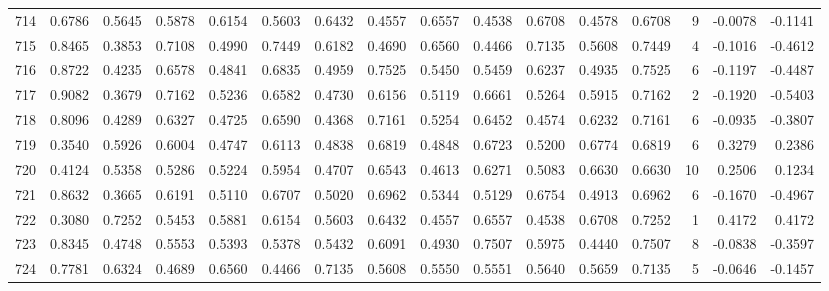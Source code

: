 \begin{tabular}{lrrrrrrrrrrrrrrr}
714 &      0.6786 &  0.5645 &  0.5878 &  0.6154 &  0.5603 &  0.6432 &  0.4557 &  0.6557 &  0.4538 &  0.6708 &   0.4578 &     0.6708 &      9 &                   -0.0078 &                    -0.1141 \\
715 &      0.8465 &  0.3853 &  0.7108 &  0.4990 &  0.7449 &  0.6182 &  0.4690 &  0.6560 &  0.4466 &  0.7135 &   0.5608 &     0.7449 &      4 &                   -0.1016 &                    -0.4612 \\
716 &      0.8722 &  0.4235 &  0.6578 &  0.4841 &  0.6835 &  0.4959 &  0.7525 &  0.5450 &  0.5459 &  0.6237 &   0.4935 &     0.7525 &      6 &                   -0.1197 &                    -0.4487 \\
717 &      0.9082 &  0.3679 &  0.7162 &  0.5236 &  0.6582 &  0.4730 &  0.6156 &  0.5119 &  0.6661 &  0.5264 &   0.5915 &     0.7162 &      2 &                   -0.1920 &                    -0.5403 \\
718 &      0.8096 &  0.4289 &  0.6327 &  0.4725 &  0.6590 &  0.4368 &  0.7161 &  0.5254 &  0.6452 &  0.4574 &   0.6232 &     0.7161 &      6 &                   -0.0935 &                    -0.3807 \\
719 &      0.3540 &  0.5926 &  0.6004 &  0.4747 &  0.6113 &  0.4838 &  0.6819 &  0.4848 &  0.6723 &  0.5200 &   0.6774 &     0.6819 &      6 &                    0.3279 &                     0.2386 \\
720 &      0.4124 &  0.5358 &  0.5286 &  0.5224 &  0.5954 &  0.4707 &  0.6543 &  0.4613 &  0.6271 &  0.5083 &   0.6630 &     0.6630 &     10 &                    0.2506 &                     0.1234 \\
721 &      0.8632 &  0.3665 &  0.6191 &  0.5110 &  0.6707 &  0.5020 &  0.6962 &  0.5344 &  0.5129 &  0.6754 &   0.4913 &     0.6962 &      6 &                   -0.1670 &                    -0.4967 \\
722 &      0.3080 &  0.7252 &  0.5453 &  0.5881 &  0.6154 &  0.5603 &  0.6432 &  0.4557 &  0.6557 &  0.4538 &   0.6708 &     0.7252 &      1 &                    0.4172 &                     0.4172 \\
723 &      0.8345 &  0.4748 &  0.5553 &  0.5393 &  0.5378 &  0.5432 &  0.6091 &  0.4930 &  0.7507 &  0.5975 &   0.4440 &     0.7507 &      8 &                   -0.0838 &                    -0.3597 \\
724 &      0.7781 &  0.6324 &  0.4689 &  0.6560 &  0.4466 &  0.7135 &  0.5608 &  0.5550 &  0.5551 &  0.5640 &   0.5659 &     0.7135 &      5 &                   -0.0646 &                    -0.1457 \\

\end{tabular}
